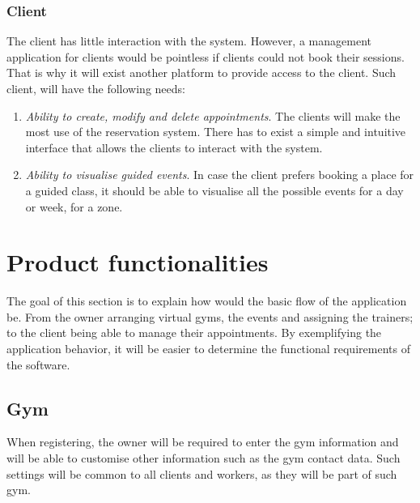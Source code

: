 \documentclass[a4paper, 12pt, oneside]{book}
\begin{document}
\subsubsection{Client}
The client has little interaction with the system. However, a management application for clients would be pointless if clients could not book their sessions. That is why it will exist another platform to provide access to the client. Such client, will have the following needs:
\begin{enumerate}[label = -]
	\item \emph{Ability to create, modify and delete appointments}. The clients will make the most use of the reservation system. There has to exist a simple and intuitive interface that allows the clients to interact with the system.
	\item \emph{Ability to visualise guided events}. In case the client prefers booking a place for a guided class, it should be able to visualise all the possible events for a day or week, for a zone.
\end{enumerate}
\section{Product functionalities}
The goal of this section is to explain how would the basic flow of the application be. From the owner arranging virtual gyms, the events and assigning the trainers; to the client being able to manage their appointments. By exemplifying the application behavior, it will be easier to determine the functional requirements of the software.
\subsection{Gym}
When registering, the owner will be required to enter the gym information and will be able to customise other information such as the gym contact data. Such settings will be common to all clients and workers, as they will be part of such gym.
\end{document}

